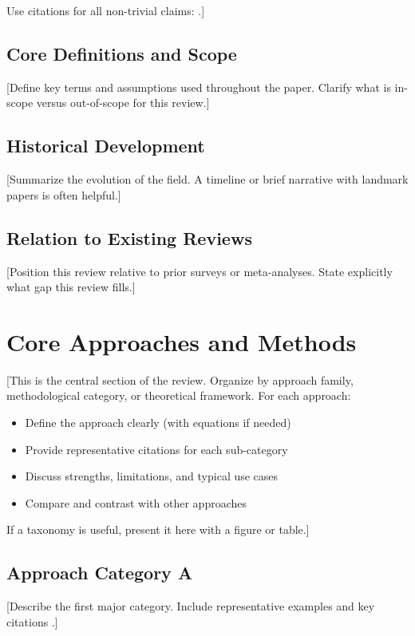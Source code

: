 \documentclass[11pt,a4paper]{article}
\begin{document}
Use citations for all non-trivial claims: \citep{jones2024study}.]

\subsection{Core Definitions and Scope}
[Define key terms and assumptions used throughout the paper. Clarify what is
in-scope versus out-of-scope for this review.]

\subsection{Historical Development}
[Summarize the evolution of the field. A timeline or brief narrative with
landmark papers is often helpful.]

\subsection{Relation to Existing Reviews}
[Position this review relative to prior surveys or meta-analyses. State
explicitly what gap this review fills.]

\section{Core Approaches and Methods}
[This is the central section of the review. Organize by approach family,
methodological category, or theoretical framework. For each approach:
\begin{itemize}
    \item Define the approach clearly (with equations if needed)
    \item Provide representative citations for each sub-category
    \item Discuss strengths, limitations, and typical use cases
    \item Compare and contrast with other approaches
\end{itemize}

If a taxonomy is useful, present it here with a figure or table.]

\subsection{Approach Category A}
[Describe the first major category. Include representative examples
and key citations \citep{firstmethod2023}.]
\end{document}
